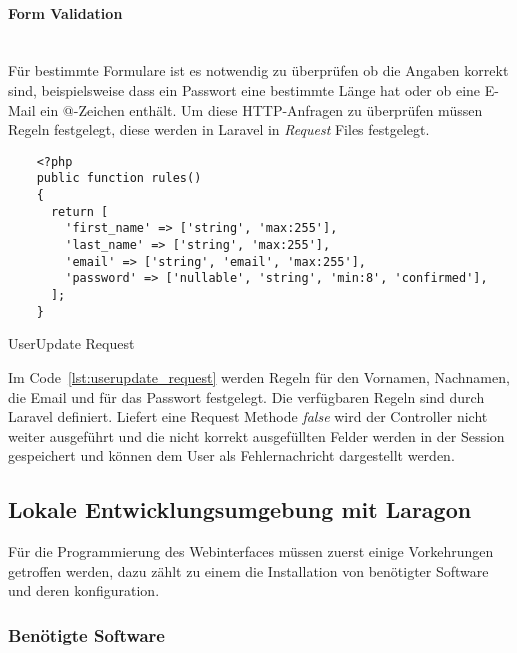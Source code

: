 \paragraph{Form Validation}\mbox{}\\
Für bestimmte Formulare ist es notwendig zu überprüfen ob die Angaben korrekt
sind, beispielsweise dass ein Passwort eine bestimmte Länge hat oder ob eine
E-Mail ein @-Zeichen enthält. Um diese HTTP-Anfragen zu überprüfen müssen Regeln
festgelegt, diese werden in Laravel in \textit{Request} Files festgelegt.

\begin{listing}[H]
  \begin{verbatim}
    <?php
    public function rules()
    {
      return [
        'first_name' => ['string', 'max:255'],
        'last_name' => ['string', 'max:255'],
        'email' => ['string', 'email', 'max:255'],
        'password' => ['nullable', 'string', 'min:8', 'confirmed'],
      ];
    }
  \end{verbatim}
  \caption{UserUpdate Request}
  \label{lst:userupdate_request}
\end{listing}

Im Code~\ref{lst:userupdate_request} werden Regeln für den Vornamen, Nachnamen,
die Email und für das Passwort festgelegt. Die verfügbaren Regeln sind durch
Laravel definiert. Liefert eine Request Methode \textit{false} wird der
Controller nicht weiter ausgeführt und die nicht korrekt ausgefüllten Felder
werden in der Session gespeichert und können dem User als Fehlernachricht
dargestellt werden.



\subsection{Lokale Entwicklungsumgebung mit Laragon}
Für die Programmierung des Webinterfaces müssen zuerst einige Vorkehrungen
getroffen werden, dazu zählt zu einem die Installation von benötigter Software
und deren konfiguration.

\subsubsection{Benötigte Software}

